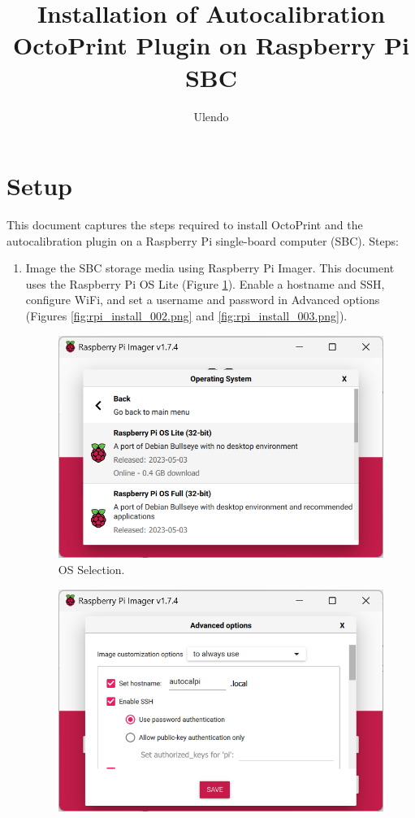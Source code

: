 \documentclass[12pt]{article}
\title{Installation of Autocalibration OctoPrint Plugin on Raspberry Pi SBC}
\author{Ulendo}
\date{\vspace{-5ex}} %
\begin{document}
\maketitle

\section{Setup}
This document captures the steps required to install OctoPrint and the autocalibration plugin on a Raspberry Pi single-board computer (SBC). Steps:
\begin{enumerate}
	\item Image the SBC storage media using Raspberry Pi Imager. This document uses the Raspberry Pi OS Lite (Figure \ref{fig:rpi_install_001.png}). Enable a hostname and SSH, configure WiFi, and set a username and password in Advanced options (Figures \ref{fig:rpi_install_002.png} and \ref{fig:rpi_install_003.png}).
\begin{figure}[H]
	\centering
	\includegraphics{rpi_install_001.png}
	\caption{OS Selection.}
	\label{fig:rpi_install_001.png}
\end{figure}
\begin{figure}[H]
	\centering
	\includegraphics{rpi_install_002.png}

\end{figure}
\end{enumerate}
\end{document}
